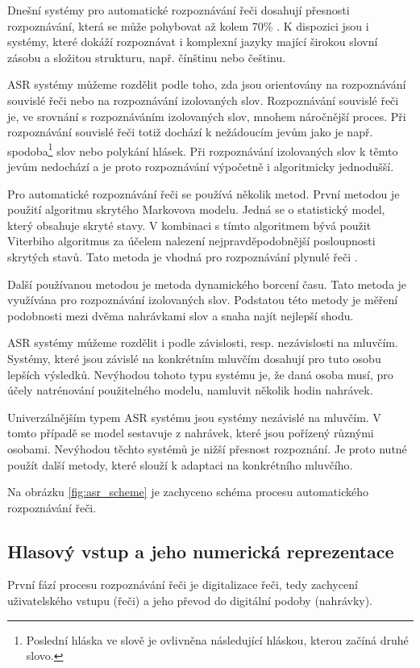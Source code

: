 \documentclass[ing,male,java,dept460,twoside]{diploma}						%
\begin{document}
Dnešní systémy pro automatické rozpoznávání řeči dosahují přesnosti rozpoznávání, která se může pohybovat až kolem 70\% \cite{vxmldevguide}. K dispozici jsou i systémy, které dokáží rozpoznávat i komplexní jazyky mající širokou slovní zásobu a složitou strukturu, např. čínštinu nebo češtinu.

ASR systémy můžeme rozdělit podle toho, zda jsou orientovány na rozpoznávání souvislé řeči nebo na rozpoznávání izolovaných slov. Rozpoznávání souvislé řeči je, ve srovnání s rozpoznáváním izolovaných slov, mnohem náročnější proces. Při rozpoznávání souvislé řeči totiž dochází k nežádoucím jevům jako je např. spodoba\footnote{Poslední hláska ve slově je ovlivněna následující hláskou, kterou začíná druhé slovo.} slov nebo polykání hlásek. Při rozpoznávání izolovaných slov k těmto jevům nedochází a je proto rozpoznávání výpočetně i algoritmicky jednodušší.

Pro automatické rozpoznávání řeči se používá několik metod. První metodou je použití algoritmu skrytého Markovova modelu. Jedná se o statistický model, který obsahuje skryté stavy. V kombinaci s tímto algoritmem bývá použit Viterbiho algoritmus za účelem nalezení nejpravděpodobnější posloupnosti skrytých stavů. Tato metoda je vhodná pro rozpoznávání plynulé řeči \cite{asr_wiki}.

Další používanou metodou je metoda dynamického borcení času. Tato metoda je využívána pro rozpoznávání izolovaných slov. Podstatou této metody je měření podobnosti mezi dvěma nahrávkami slov a snaha najít nejlepší shodu.

ASR systémy můžeme rozdělit i podle závislosti, resp. nezávislosti na mluvčím. Systémy, které jsou závislé na konkrétním mluvčím dosahují pro tuto osobu lepších výsledků. Nevýhodou tohoto typu systému je, že daná osoba musí, pro účely natrénování použitelného modelu, namluvit několik hodin nahrávek.

Univerzálnějším typem ASR systému jsou systémy nezávislé na mluvčím. V tomto případě se model sestavuje z nahrávek, které jsou pořízený různými osobami. Nevýhodou těchto systémů je nižší přesnost rozpoznání. Je proto nutné použít další metody, které slouží k adaptaci na konkrétního mluvčího.

Na obrázku \ref{fig:asr_scheme} je zachyceno schéma procesu automatického rozpoznávání řeči.


\subsection{Hlasový vstup a jeho numerická reprezentace}
První fází procesu rozpoznávání řeči je digitalizace řeči, tedy zachycení uživatelského vstupu (řeči) a jeho převod do digitální podoby (nahrávky).
\end{document}
